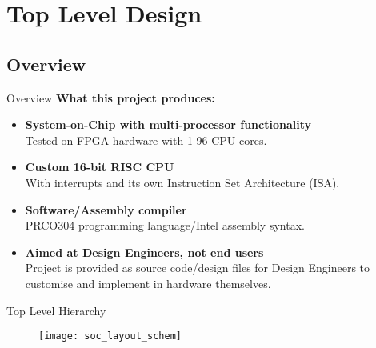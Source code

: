 \documentclass[aspectratio=169]{beamer}
\begin{document}
\section{Top Level Design}
\frame{\tableofcontents[currentsection, subsectionstyle=show/show/hide]}

\subsection{Overview}
\begin{frame}{Overview}
\textbf{What this project produces:}
\begin{itemize}[<+->]\setlength\itemsep{1em}
    \item{\textbf{System-on-Chip with multi-processor functionality}\\
    Tested on FPGA hardware with 1-96 CPU cores.}
    
    \item{\textbf{Custom 16-bit RISC CPU}\\
    With interrupts and its own Instruction Set Architecture (ISA).}
    
    \item{\textbf{Software/Assembly compiler}\\
    PRCO304 programming language/Intel assembly syntax.}
    
    \item{\textbf{Aimed at Design Engineers, not end users}\\
    Project is provided as source code/design files for Design Engineers to customise and implement in hardware themselves.}
\end{itemize}
\end{frame}

\begin{frame}{Top Level Hierarchy}
\vspace{-.3cm}
\begin{figure}
\texttt{[image: soc\_layout\_schem]}
\end{figure}
\end{frame}
\end{document}
